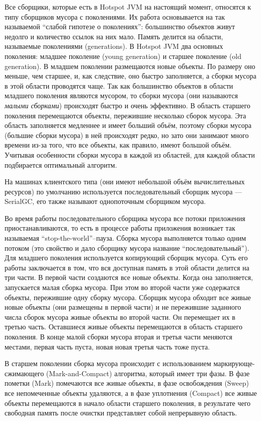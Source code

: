 Все сборщики, которые есть в Hotspot JVM на настоящий момент, относятся к типу сборщиков мусора
с поколениями. Их работа основывается на так называемой ``слабой гипотезе о поколениях'':
большинство объектов живут недолго и количество ссылок на них мало. Память делится на области, называемые
поколениями (generations). В Hotspot JVM два основных поколения: младшее поколение (young generation)
и старшее поколение (old generation). В младшем поколении размещаются новые объекты. По размеру оно меньше, чем 
старшее, и, как следствие, оно быстро заполняется, а сборки мусора в этой
области проводятся чаще. Так как большинство объектов в области младшего поколения
являются мусором, то сборки мусора (они называются \emph{малыми сборками}) происходят быстро и очень 
эффективно. В область старшего поколения перемещаются объекты, пережившие несколько сборок мусора. 
Эта область заполняется медленнее и имеет больший объём, поэтому сборки мусора (большие сборки мусора) в 
ней происходят редко, но зато они занимают много времени из-за того, что все объекты, как правило, 
имеют большой объём. Учитывая особенности сборки мусора в каждой из областей, для каждой области 
подбирается оптимальный алгоритм.

На машинах клиентского типа (они имеют небольшой объём вычислительных ресурсов) по
умолчанию используется последовательный сборщик мусора --- SerialGC, его также 
называют однопоточным сборщиком мусора. 

Во время работы последовательного сборщика мусора все потоки приложения приостанавливаются, то есть в 
процессе работы приложения возникает так называемая ``stop-the-world''--пауза. Сборка мусора выполняется только 
одним потоком (это свойство и дало сборщику мусора название ``последовательный'').
Для младшего поколения используется копирующий сборщик мусора. Суть его работы заключается
в том, что вся доступная память в этой области делится на три части.
В первой части создаются все новые объекты. Когда она заполняется,
запускается малая сборка мусора. При этом во второй части уже содержатся объекты, пережившие
одну сборку мусора. Сборщик мусора обходит все живые новые объекты (они размещены в первой части) и не 
пережившие заданного числа сборок мусора живые объекты во второй части. Он перемещает их в третью часть.
Оставшиеся живые объекты перемещаются в область старшего поколения. В конце малой сборки мусора
вторая и третья части меняются местами, первая часть пуста, новая новая третья часть тоже пуста. 

В старшем поколении сборка мусора происходит с использованием маркирующе-сжимающего
(Mark-and-Compact) алгоритма, который имеет три фазы. В фазе пометки (Mark) помечаются
все живые объекты, в фазе освобождения (Sweep) все непомеченные объекты удаляются, 
а в фазе уплотнения (Compact) все живые объекты перемещаются в начало области старшего поколения, 
в результате чего свободная память после очистки представляет собой непрерывную область. 

